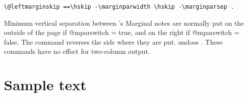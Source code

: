 \begin{tcolorbox}
\begin{lstlisting}
\@leftmarginskip ==\hskip -\marginparwidth \hskip -\marginparsep .
\end{lstlisting}
\end{tcolorbox}

 Minimum vertical separation between 's
Marginal notes are normally put on the outside of the page
if @mparswitch = true, and on the right if @mparswitch = false.
The command  reverses the side where they
are put.  undoes .
These commands have no effect for two-column output.
\section{Sample text}
\lipsum[2-4]

\restoregeometry
